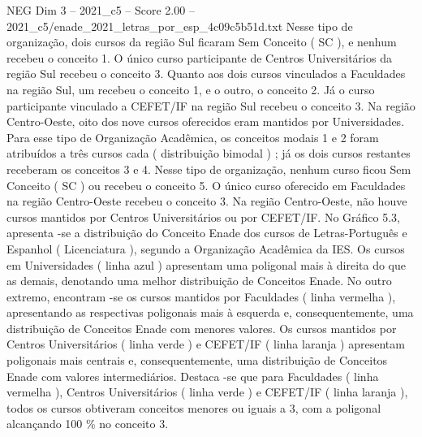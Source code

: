 \begin{textsample}{NEG Dim 3 – 2021\_c5 – Score 2.00 – 2021\_c5/enade\_2021\_letras\_por\_esp\_4c09c5b51d.txt}
Nesse tipo de organização, dois cursos da região Sul ficaram Sem Conceito ( SC ), e nenhum recebeu o conceito 1.
O único curso participante de Centros Universitários da região Sul recebeu o conceito 3.
Quanto aos dois cursos vinculados a Faculdades na região Sul, um recebeu o conceito 1, e o outro, o conceito 2.
Já o curso participante vinculado a CEFET/IF na região Sul recebeu o conceito 3.
Na região Centro-Oeste, oito dos nove cursos oferecidos eram mantidos por Universidades.
Para esse tipo de Organização Acadêmica, os conceitos modais 1 e 2 foram atribuídos a três cursos cada ( distribuição bimodal ) ; já os dois cursos restantes receberam os conceitos 3 e 4.
Nesse tipo de organização, nenhum curso ficou Sem Conceito ( SC ) ou recebeu o conceito 5.
O único curso oferecido em Faculdades na região Centro-Oeste recebeu o conceito 3.
Na região Centro-Oeste, não houve cursos mantidos por Centros Universitários ou por CEFET/IF.
No Gráfico 5.3, apresenta -se a distribuição do Conceito Enade dos cursos de Letras-Português e Espanhol ( Licenciatura ), segundo a Organização Acadêmica da IES.
Os cursos em Universidades ( linha azul ) apresentam uma poligonal mais à direita do que as demais, denotando uma melhor distribuição de Conceitos Enade.
No outro extremo, encontram -se os cursos mantidos por Faculdades ( linha vermelha ), apresentando as respectivas poligonais mais à esquerda e, consequentemente, uma distribuição de Conceitos Enade com menores valores.
Os cursos mantidos por Centros Universitários ( linha verde ) e CEFET/IF ( linha laranja ) apresentam poligonais mais centrais e, consequentemente, uma distribuição de Conceitos Enade com valores intermediários.
Destaca -se que para Faculdades ( linha vermelha ), Centros Universitários ( linha verde ) e CEFET/IF ( linha laranja ), todos os cursos obtiveram conceitos menores ou iguais a 3, com a poligonal alcançando 100 \% no conceito 3.

\end{textsample}
